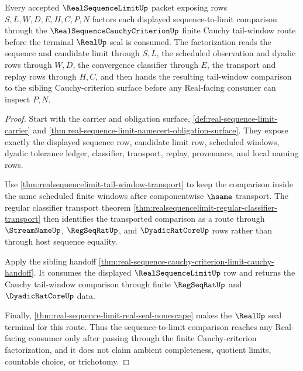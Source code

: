 \begin{theorem}\label{thm:real-sequence-limit-cauchy-criterion-factorization}
Every accepted $\RealSequenceLimitUp$ packet exposing rows $S,L,W,D,E,H,C,P,N$ factors each displayed sequence-to-limit comparison through the $\RealSequenceCauchyCriterionUp$ finite Cauchy tail-window route before the terminal $\RealUp$ seal is consumed. The factorization reads the sequence and candidate limit through $S,L$, the scheduled observation and dyadic rows through $W,D$, the convergence classifier through $E$, the transport and replay rows through $H,C$, and then hands the resulting tail-window comparison to the sibling Cauchy-criterion surface before any Real-facing consumer can inspect $P,N$.
\end{theorem}
\begin{proof}
Start with the carrier and obligation surface, \autoref{def:real-sequence-limit-carrier} and \autoref{thm:real-sequence-limit-namecert-obligation-surface}. They expose exactly the displayed sequence row, candidate limit row, scheduled windows, dyadic tolerance ledger, classifier, transport, replay, provenance, and local naming rows.

Use \autoref{thm:realsequencelimit-tail-window-transport} to keep the comparison inside the same scheduled finite windows after componentwise $\hsame$ transport. The regular classifier transport theorem \autoref{thm:realsequencelimit-regular-classifier-transport} then identifies the transported comparison as a route through $\StreamNameUp$, $\RegSeqRatUp$, and $\DyadicRatCoreUp$ rows rather than through host sequence equality.

Apply the sibling handoff \autoref{thm:real-sequence-cauchy-criterion-limit-cauchy-handoff}. It consumes the displayed $\RealSequenceLimitUp$ row and returns the Cauchy tail-window comparison through finite $\RegSeqRatUp$ and $\DyadicRatCoreUp$ data.

Finally, \autoref{thm:real-sequence-limit-real-seal-nonescape} makes the $\RealUp$ seal terminal for this route. Thus the sequence-to-limit comparison reaches any Real-facing consumer only after passing through the finite Cauchy-criterion factorization, and it does not claim ambient completeness, quotient limits, countable choice, or trichotomy.
\end{proof}

